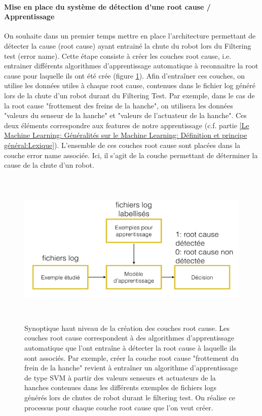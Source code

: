 \paragraph{Mise en place du système de détection d'une root cause / Apprentissage}
On souhaite dans un premier temps mettre en place l'architecture permettant de détecter la cause (root cause) ayant entrainé la chute du robot lors du Filtering test (error name). Cette étape consiste à créer les couches root cause, i.e. entrainer différents algorithmes d'apprentissage automatique à reconnaitre la root cause pour laquelle ils ont été crée (figure \ref{fig:Creation des couches root cause}). Afin d'entraîner ces couches, on utilise les données utiles à chaque root cause, contenues dans le fichier log généré lors de la chute d'un robot durant du Filtering Test. Par exemple, dans le cas de la root cause "frottement des freins de la hanche", on utilisera les données "valeurs du senseur de la hanche" et "valeurs de l'actuateur de la hanche". Ces deux éléments correspondre aux features de notre apprentissage (c.f. partie \ref{Le Machine Learning: Généralités sur le Machine Learning: Définition et principe général:Lexique}). L'ensemble de ces couches root cause sont placées dans la couche error name associée. Ici, il s'agit de la couche permettant de déterminer la cause de la chute d'un robot.

\begin{figure}[h]
	\centering\includegraphics[height=7.5cm]{images/synoptique_root.png}
	\caption[Creation des couches root cause]{Synoptique haut niveau de la création des couches root cause. Les couches root cause correspondent à des algorithmes d'apprentissage automatique que l'ont entraîne à détecter la root cause à laquelle ils sont associés. Par exemple, créer la couche root cause "frottement du frein de la hanche" revient à entraîner un algorithme d'apprentissage de type SVM à partir des valeurs senseurs et actuateurs de la hanches contenues dans les différents exemples de fichiers logs générés lors de chutes de robot durant le filtering test. On réalise ce processus pour chaque couche root cause que l'on veut créer.}
	\label{fig:Creation des couches root cause}
\end{figure}

